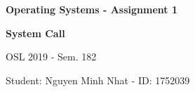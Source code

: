 
\begin{center}
\vspace*{1cm}

\normalsize
\textbf{Operating Systems - Assignment 1}

\vspace{0.5cm}
\Huge
\textbf{System Call}

\vspace{0.5cm}
\Large
 OSL 2019 - Sem. 182

\vspace{0.5cm}

Student: Nguyen Minh Nhat - ID: 1752039
\end{center}

\hrulefill

\vspace{1cm}